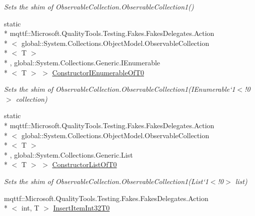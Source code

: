 \begin{DoxyCompactItemize}
\begin{DoxyCompactList}\small\item\em Sets the shim of Observable\-Collection{.\-Observable\-Collection}1()\end{DoxyCompactList}\item 
static \\*
mqttf\-::\-Microsoft.\-Quality\-Tools.\-Testing.\-Fakes.\-Fakes\-Delegates.\-Action\\*
$<$ global\-::\-System.\-Collections.\-Object\-Model.\-Observable\-Collection\\*
$<$ T $>$\\*
, global\-::\-System.\-Collections.\-Generic.\-I\-Enumerable\\*
$<$ T $>$ $>$ \hyperlink{class_system_1_1_collections_1_1_object_model_1_1_fakes_1_1_shim_observable_collection_3_01_t_01_4_a362d9f6d055e10871a16d1d8d8f049ff}{Constructor\-I\-Enumerable\-Of\-T0}
\begin{DoxyCompactList}\small\item\em Sets the shim of Observable\-Collection{.\-Observable\-Collection}1(I\-Enumerable`1$<$!0$>$ collection)\end{DoxyCompactList}\item 
static \\*
mqttf\-::\-Microsoft.\-Quality\-Tools.\-Testing.\-Fakes.\-Fakes\-Delegates.\-Action\\*
$<$ global\-::\-System.\-Collections.\-Object\-Model.\-Observable\-Collection\\*
$<$ T $>$\\*
, global\-::\-System.\-Collections.\-Generic.\-List\\*
$<$ T $>$ $>$ \hyperlink{class_system_1_1_collections_1_1_object_model_1_1_fakes_1_1_shim_observable_collection_3_01_t_01_4_a86104a66c19c565ef9765b0531b26d09}{Constructor\-List\-Of\-T0}
\begin{DoxyCompactList}\small\item\em Sets the shim of Observable\-Collection{.\-Observable\-Collection}1(List`1$<$!0$>$ list)\end{DoxyCompactList}\item 
mqttf\-::\-Microsoft.\-Quality\-Tools.\-Testing.\-Fakes.\-Fakes\-Delegates.\-Action\\*
$<$ int, T $>$ \hyperlink{class_system_1_1_collections_1_1_object_model_1_1_fakes_1_1_shim_observable_collection_3_01_t_01_4_a84b0154e88936d225c98fbf24a733bef}{Insert\-Item\-Int32\-T0}

\end{DoxyCompactItemize}
